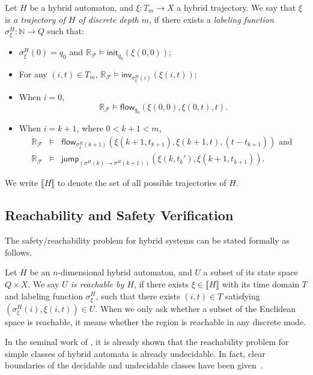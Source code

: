 \documentclass[envcountsect]{llncs}
\newcommand{\flow}{\mathsf{flow}}
\newcommand{\jump}{\mathsf{jump}}
\newcommand{\inv}{\mathsf{inv}}
\newcommand{\init}{\mathsf{init}}
\begin{document}
\begin{definition}\label{trajec}
Let $H$ be a hybrid automaton, and $\xi: T_m\rightarrow X$ a hybrid trajectory.
We say that $\xi$ is {\em a trajectory of $H$ of discrete depth $m$}, if there
exists a {\em labeling function} $\sigma^H_{\xi}: \mathbb{N}\rightarrow Q$ such
that:
\begin{itemize}
\item $\sigma^H_{\xi}(0) = q_0$ and
$\mathbb{R}_{\mathcal{F}}\models \init_{q_0}(\xi(0,0))$;
\item For any $(i, t)\in T_m$,
$\mathbb{R}_{\mathcal{F}}\models \inv_{\sigma^H_{\xi}(i)} (\xi(i,t))$;
\item When $i=0$,
$$\mathbb{R}_{\mathcal{F}}\models\flow_{q_0}(\xi(0,0), \xi(0,t), t).$$
\item When $i = k+1$, where $0< k+1 <m$,
\begin{eqnarray*}
\mathbb{R}_{\mathcal{F}}&\models&\flow_{\sigma^H_{\xi}(k+1)}(\xi(k+1, t_{k+1}),
\xi(k+1, t), (t - t_{k+1}))\mbox{ and }\\
\mathbb{R}_{\mathcal{F}}&\models& \jump_{(\sigma^H(k)\rightarrow
\sigma^H(k+1))}(\xi(k, t_k'), \xi(k+1,t_{k+1})).
\end{eqnarray*}
\end{itemize}
\end{definition}
We write $\llbracket H\rrbracket$ to denote the set of all possible trajectories
of $H$.

\subsection{Reachability and Safety Verification}

The safety/reachability problem for hybrid systems can be stated formally as
follows. 
\begin{definition}[Reachability]\label{reachability}
Let $H$ be an $n$-dimensional hybrid automaton, and $U$ a subset of its state
space $Q\times X$.  We say {\em $U$ is reachable by $H$}, if there exists
$\xi\in\llbracket
H \rrbracket$ with its time domain $T$ and labeling function
$\sigma_{\xi}^H$, such that there exists $(i,t)\in T$ satisfying
$(\sigma^H_{\xi}(i), \xi(i,t))\in U.$ When we only ask whether a subset of the
Euclidean space is reachable, it means whether the region is reachable in any
discrete mode.
\end{definition}
In the seminal work of \cite{DBLP:conf/rex/AlurD91,DBLP:conf/hybrid/AlurCHH92},
it is already shown that the reachability problem for simple classes of hybrid
automata is already undecidable. In fact, clear boundaries of the decidable and
undecidable classes have been given~\cite{DBLP:journals/jcss/HenzingerKPV98}.
\end{document}
